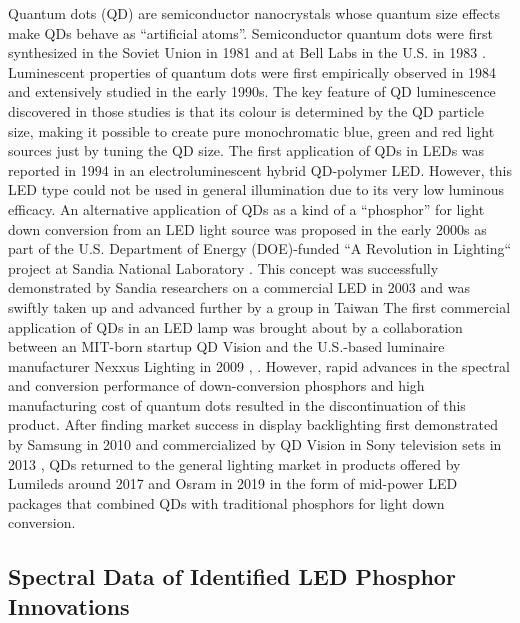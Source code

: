\documentclass[10pt]{article}
\begin{document}
Quantum dots (QD) are semiconductor nanocrystals whose quantum size effects make QDs behave as “artificial atoms”. Semiconductor quantum dots were first synthesized in the Soviet Union in 1981 \cite{ekimov1981quantum} and at Bell Labs in the U.S. in 1983 \cite{Rossetti1983}. Luminescent properties of quantum dots were first empirically observed in 1984 \cite{fojtik1984photo} and extensively studied in the early 1990s. The key feature of QD luminescence discovered in those studies is that its colour is determined by the QD particle size, making it possible to create pure monochromatic blue, green and red light sources just by tuning the QD size. The first application of QDs in LEDs was reported in 1994 in an electroluminescent hybrid QD-polymer LED. However, this LED type could not be used in general illumination due to its very low luminous efficacy. An alternative application of QDs as a kind of a “phosphor” for light down conversion from an LED light source was proposed in the early 2000s as part of the U.S. Department of Energy (DOE)-funded “A Revolution in Lighting“ project at Sandia National Laboratory \cite{simmonsfinal}. This concept was successfully demonstrated by Sandia researchers on a commercial LED in 2003 \cite{shea_rohwer_development_2004}\cite{noauthor_sandia_nodate} and was swiftly taken up and advanced further by a group in Taiwan \cite{chen_white-light_2005}\cite{hsueh-shih_chen_ingan-cdse-znse_2006} The first commercial application of QDs in an LED lamp was brought about by a collaboration between an MIT-born startup QD Vision and the U.S.-based luminaire manufacturer Nexxus Lighting in 2009 \cite{ledprof_nexxusqd}, \cite{bourzac2013quantum}. However, rapid advances in the spectral and conversion performance of down-conversion phosphors and high manufacturing cost of quantum dots resulted in the discontinuation of this product. After finding market success in display backlighting first demonstrated by Samsung in 2010 \cite{Jang2010} and commercialized by QD Vision in Sony television sets in 2013 \cite{bourzac2013quantum}, QDs returned to the general lighting market in products offered by Lumileds \cite{noauthor_global_2017}\cite{noauthor_quantum_2020} around 2017 and Osram in 2019 \cite{osramqdots} in the form of mid-power LED packages that combined QDs with traditional phosphors for light down conversion.

\subsection{Spectral Data of Identified LED Phosphor Innovations}
\end{document}
